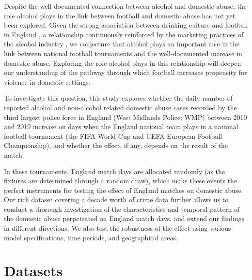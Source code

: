 \documentclass[12pt, a4paper]{article}
\begin{document}


Despite the well-documented connection between alcohol and domestic abuse, the role alcohol plays in the link between football and domestic abuse has not yet been explored. Given the strong association between drinking culture and football in England \cite{Dixon2014}, a relationship continuously reinforced by the marketing practices of the alcohol industry \cite{Gornall2014}, we conjecture that alcohol plays an important role in the link between national football tournaments and the well-documented increase in domestic abuse. Exploring the role alcohol plays in this relationship will deepen our understanding of the pathway through which football increases propensity for violence in domestic settings.

To investigate this question, this study explores whether the daily number of reported alcohol and non-alcohol related domestic abuse cases recorded by the third largest police force in England (West Midlands Police; WMP) between 2010 and 2019 increase on days when the England national team plays in a national football tournament (the FIFA World Cup and UEFA European Football Championship), and whether the effect, if any, depends on the result of the match.

 In these tournaments, England match days are allocated randomly (as the fixtures are determined through a random draw), which make these events the perfect instruments for testing the effect of England matches on domestic abuse. Our rich dataset covering a decade worth of crime data further allows us to conduct a thorough investigation of the characteristics and temporal pattern of the domestic abuse perpetrated on England match days, and extend our findings in different directions. We also test the robustness of the effect using various model specifications, time periods, and geographical areas. 



\section{Datasets}
\end{document}
